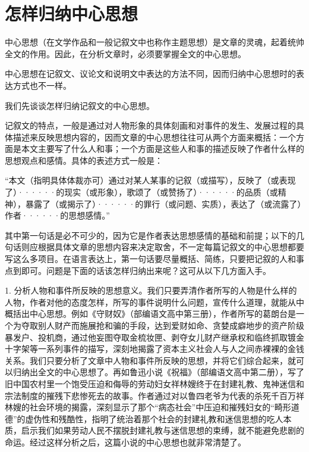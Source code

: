 \section{怎样归纳中心思想}

中心思想（在文学作品和一般记叙文中也称作主题思想）是文章的灵魂，起着统帅全文的作用。因此，在分析文章时，必须要掌握全文的中心思想。

中心思想在记叙文、议论文和说明文中表达的方法不同，因而归纳中心思想时的表达方式也不一样。

我们先谈谈怎样归纳记叙文的中心思想。

记叙文的特点，一般是通过对人物形象的具体刻画和对事件的发生、发展过程的具体描述来反映思想内容的，因而文章的中心思想往往可从两个方面来概括：一个方面是本文主要写了什么人和事；一个方面是这些人和事的描述反映了作者什么样的思想观点和感情。具体的表述方式一般是：

“本文（指明具体体裁亦可）通过对某人某事的记叙（或描写），反映了（或表现了）······的现实（或形象），歌颂了（或赞扬了）······的品质（或精神），暴露了（或揭示了）······的罪行（或问题、实质），表达了（或流露了）作者······的思想感情。”

其中第一句话是必不可少的，因为它是作者表达思想感情的基础和前提；以下的几句话则应根据具体文章的思想内容来决定取舍，不一定每篇记叙文的中心思想都要写这么多项目。在语言表达上，第一句话要尽量概括、简练，只要把记叙的人和事点到即可。问题是下面的话该怎样归纳出来呢？这可从以下几方面入手。

1. 分析人物和事件所反映的思想意义。我们只要弄清作者所写的人物是什么样的人物，作者对他的态度怎样，所写的事件说明什么问题，宣传什么道理，就能从中概括出中心思想。例如《守财奴》（部编语文高中第三册），作者所写的葛朗台是一个为夺取别人财产而施展抢和骗的手段，达到爱财如命、贪婪成癖地步的资产阶级暴发户、投机商，通过他妄图夺取金梳妆匣、剥夺女儿财产继承权和临终抓取镀金十字架等一系列事件的描写，深刻地揭露了资本主义社会人与人之间赤裸裸的金钱关系。我们只要分析了文章中人物和事件所反映的思想，并将它们综合起来，就可以归纳出全文的中心思想了。再如鲁迅小说《祝福》（部编语文高中第二册），写了旧中国农村里一个饱受压迫和侮辱的劳动妇女祥林嫂终于在封建礼教、鬼神迷信和宗法制度的摧残下悲惨死去的故事。作者通过对以鲁四老爷为代表的杀死千百万祥林嫂的社会环境的揭露，深刻显示了那个“病态社会”中压迫和摧残妇女的“畸形道德”的虚伪性和残酷性，指明了统治着那个社会的封建礼教和迷信思想的吃人本质，启示我们如果劳动人民不摆脱封建礼教与迷信思想的束缚，就不能避免悲剧的命运。经过这样分析之后，这篇小说的中心思想也就非常清楚了。

